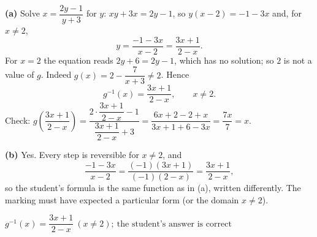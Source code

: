 \textbf{(a)} Solve $x=\dfrac{2y-1}{y+3}$ for $y$: $xy+3x=2y-1$, so $y(x-2)=-1-3x$ and, for $x\ne2$,
\[y=\dfrac{-1-3x}{x-2}=\dfrac{3x+1}{2-x}.\]
For $x=2$ the equation reads $2y+6=2y-1$, which has no solution; so $2$ is not a value of $g$. Indeed $g(x)=2-\dfrac{7}{x+3}\ne2$. Hence
\[g^{-1}(x)=\dfrac{3x+1}{2-x},\qquad x\ne2.\]
Check: $g\left(\dfrac{3x+1}{2-x}\right)=\dfrac{2\cdot\dfrac{3x+1}{2-x}-1}{\dfrac{3x+1}{2-x}+3}=\dfrac{6x+2-2+x}{3x+1+6-3x}=\dfrac{7x}{7}=x.$

\textbf{(b)} Yes. Every step is reversible for $x\ne2$, and
\[\dfrac{-1-3x}{x-2}=\dfrac{(-1)(3x+1)}{(-1)(2-x)}=\dfrac{3x+1}{2-x},\]
so the student's formula is the same function as in (a), written differently. The marking must have expected a particular form (or the domain $x\ne2$).

$\boxed{g^{-1}(x)=\dfrac{3x+1}{2-x}\ (x\ne2);\ \text{the student's answer is correct}}$
